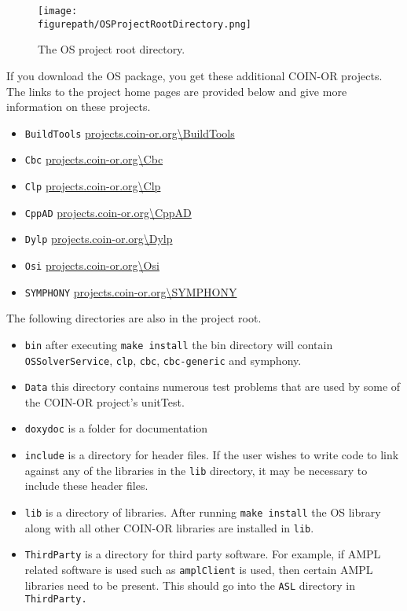 \documentclass[11pt]{article}
\newcommand{\figurepath}{./figures}
\renewcommand{\_}{{\char"5F}}
\renewcommand{\{}{{\char"7B}}
\renewcommand{\}}{{\char"7D}}
\renewcommand{\^}{{\char"0D}}
\renewcommand{\'}{{\char"0D}}
\begin{document}
\begin{figure}
\centering
\texttt{[image: \\figurepath/OSProjectRootDirectory.png]}
\caption{The OS project root directory.} 
\label{figure:osprojectrootdir}
\end{figure}

If you download the OS package, you get these additional COIN-OR projects. The links to the project home pages are provided below and give more information on these projects. 
\begin{itemize}
\item {\tt BuildTools} \url{projects.coin-or.org\BuildTools}
\item {\tt Cbc} \url{projects.coin-or.org\Cbc}
\item {\tt Clp}  \url{projects.coin-or.org\Clp}
\item {\tt CppAD} \url{projects.coin-or.org\CppAD}
\item {\tt Dylp} \url{projects.coin-or.org\Dylp}
\item {\tt Osi} \url{projects.coin-or.org\Osi}
\item {\tt SYMPHONY}   \url{projects.coin-or.org\SYMPHONY}
\end{itemize}

The following directories are also in the project root. 
\begin{itemize}
\item {\tt bin} after executing {\tt make install} the bin directory will contain {\tt OSSolverService}, {\tt clp}, {\tt cbc},  {\tt cbc-generic} and {symphony}.

\item {\tt Data} this directory contains numerous test problems that are used by some of the COIN-OR project's unitTest.

\item {\tt doxydoc} is a folder for documentation

\item {\tt include} is a directory for header files. If the user wishes to write code to link against any of the libraries in the {\tt lib} directory, it may be necessary to include these header files.

\item {\tt lib} is a directory of libraries. After running {\tt make install} the OS library along with all other COIN-OR libraries are installed in {\tt lib}.

\item {\tt ThirdParty} is a  directory for third party software. For example, if AMPL related software is used such as {\tt amplClient} is used, then certain AMPL libraries need to be present. This should go into the {\tt ASL} directory in {\tt ThirdParty.}
\end{itemize}
\end{document}
